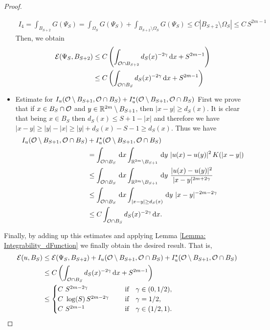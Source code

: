 \begin{proof}
\begin{itemize}
\begin{align*}
I_4 = \int_{B_{S+2}} G(\Psi_S) = \int_{\Omega_S} G(\Psi_S) + \int_{B_{S+2}\setminus \Omega_S} G(\Psi_S) \leq C |B_{S+2}\setminus \Omega_S| \leq C\,S^{2m-1}
\end{align*}
Then, we obtain
\begin{align*}
\mathcal{E}(\Psi_S,B_{S+2}) &\leq C \left(\int_{\mathcal{O} \cap B_{S+2}} d_S(x)^{-2\gamma} \,\mathrm{d} x + S^{2m-1} \right)  \\
&\leq C\left(\int_{\mathcal{O} \cap B_{S}} d_S(x)^{-2\gamma} \,\mathrm{d} x + S^{2m-1} \right)
\end{align*}
\item Estimate for $I_u(\mathcal{O} \setminus B_{S+1}, \mathcal{O} \cap B_S) + I_u^\star(\mathcal{O} \setminus B_{S+1}, \mathcal{O} \cap B_S)$
First we prove that if $x\in B_S\cap \mathcal{O}$ and $y\in \mathbb{R}^{2m}\setminus B_{S+1}$, then $|x-y|\geq d_S(x)$. It is clear that being $x\in B_S$ then $d_S(x) \leq S+1-|x|$ and therefore we have $|x-y|\geq |y|-|x|\geq |y|+d_S(x)-S-1 \geq  d_S(x)$. Thus we have
\begin{align*}
I_u(\ocal \setminus B_{S+1}, \ocal \cap B_S) &+ I_u^\star(\ocal \setminus B_{S+1}, \ocal \cap B_S) \\
&= \int_{\ocal\cap B_S} \d x \int_{\R^{2m}\setminus B_{S+1}} \d y \ |u(x)-u(y)|^2 \, K(|x-y|) \\
&\leq \int_{\ocal\cap B_S} \d x \int_{\R^{2m}\setminus B_{S+1}} \d y \ \frac{|u(x)-u(y)|^2}{|x-y|^{2m+2\s}} \\
&\leq \int_{\ocal\cap B_S} \d x \int_{|x-y|\geq d_S(x)} \d y \ |x-y|^{-2m-2\s} \\
&\leq C \int_{\ocal \cap B_{S}} d_S(x)^{-2\s} \d x.
\end{align*}
\end{itemize}
Finally, by adding up this estimates and applying Lemma \ref{Lemma: Integrability_dFunction} we finally obtain the desired result. That is,
\begin{align*}
\mathcal{E}(u,B_S) &\leq \mathcal{E}(\Psi_S,B_{S+2}) + I_u(\mathcal{O} \setminus B_{S+1}, \mathcal{O} \cap B_S) + I_u^\star(\mathcal{O} \setminus B_{S+1}, \mathcal{O} \cap B_S) \\
&\leq C\left(\int_{\mathcal{O} \cap B_{S}} d_S(x)^{-2\gamma} \,\mathrm{d} x + S^{2m-1} \right)\\
&\leq \begin{cases}
C \ S^{2m-2\gamma}\ \ \ &\textrm{if } \ \ \gamma\in(0,1/2),\\
C\ \log(S)\,S^{2m-2\gamma}\ \ \ \ &\textrm{if } \ \ \gamma=1/2,\\
C \ S^{2m-1}\ \ \ \ &\textrm{if } \ \ \gamma\in(1/2,1).\\
\end{cases}
\end{align*}

\end{proof}